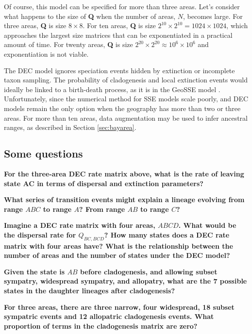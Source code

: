 Of course, this model can be specified for more than three areas.
Let's consider what happens to the size of \textbf{Q} when the number of areas, $N$, becomes large.
For three areas, \textbf{Q} is size $8 \times 8$.
For ten areas, \textbf{Q} is size $2^{10} \times 2^{10} = 1024 \times 1024$, which approaches the largest size matrices that can be exponentiated in a practical amount of time.
For twenty areas, \textbf{Q} is size $2^{20} \times 2^{20} \approx 10^6 \times 10^6$ and exponentiation is not viable.

The DEC model ignores speciation events hidden by extinction or incomplete taxon sampling.
The probability of cladogenesis and local extinction events would ideally be linked to a birth-death process, as it is in the GeoSSE model \citep{Goldberg2011}.
Unfortunately, since the numerical method for SSE models scale poorly, and DEC models remain the only option when the geography has more than two or three areas.
For more than ten areas, data augmentation may be used to infer ancestral ranges, as described in Section \ref{sec:bayarea}.


\subsection{Some questions}

{\bf {} For the three-area DEC rate matrix above, what is the rate of leaving state AC in terms of dispersal and extinction parameters?}

{\bf {} What series of transition events might explain a lineage evolving from range $ABC$ to range $A$? From range $AB$ to range $C$?}

{ \bf {} Imagine a DEC rate matrix with four areas, $ABCD$. What would be the dispersal rate for $Q_{BC,BCD}$? How many states does a DEC rate matrix with four areas have? What is the relationship between the number of areas and the number of states under the DEC model? }

{\bf {} Given the state is $AB$ before cladogenesis, and allowing subset sympatry, widespread sympatry, and allopatry, what are the 7 possible states in the daughter lineages after cladogenesis?}

{\bf {} For three areas, there are three narrow, four widespread, 18 subset sympatric events and 12 allopatric cladogenesis events. What proportion of terms in the cladogenesis matrix are zero?}



